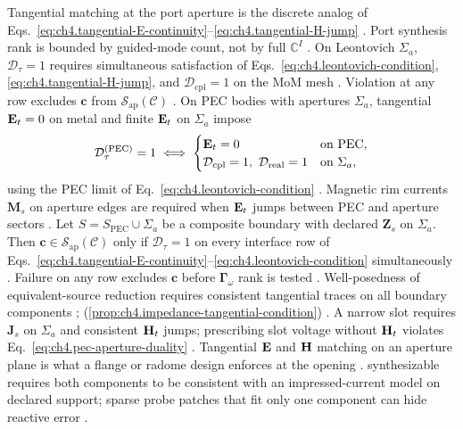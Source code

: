 Tangential matching at the port aperture is the discrete analog of Eqs.~\eqref{eq:ch4.tangential-E-continuity}--\eqref{eq:ch4.tangential-H-jump}
\cite{stratton1941}. Port synthesis rank is bounded by guided-mode count, not by full \(\mathbb{C}^{I}\)
\cite{hansen1988}.
\label{prop:ch4.impedance-tangential-condition}
On Leontovich \(\Sigma_{a}\), \(\mathcal{D}_{\tau}=1\) requires simultaneous satisfaction of
Eqs.~\eqref{eq:ch4.leontovich-condition}, \eqref{eq:ch4.tangential-H-jump}, and
\(\mathcal{D}_{\mathrm{cpl}}=1\) on the MoM mesh \cite{stratton1941}. Violation at any row
excludes \(\mathbf{c}\) from \(\mathcal{S}_{\mathrm{ap}}(\mathcal{C})\) \cite{devaney2004}.
On PEC bodies with apertures \(\Sigma_{a}\), tangential \(\mathbf{E}_{t}=0\) on metal and finite \(\mathbf{E}_{t}\) on \(\Sigma_{a}\) impose
\begin{equation}
\label{eq:ch4.pec-aperture-duality}
\mathcal{D}_{\tau}^{\mathrm{(PEC)}}
=
1
\iff
\begin{cases}
\mathbf{E}_{t}=0 & \text{on PEC},\\
\mathcal{D}_{\mathrm{cpl}}=1,\ \mathcal{D}_{\mathrm{real}}=1 & \text{on }\Sigma_{a},
\end{cases}
\end{equation}
using the PEC limit of Eq.~\eqref{eq:ch4.leontovich-condition} \cite{stratton1941}. Magnetic
rim currents \(\mathbf{M}_{s}\) on aperture edges are required when \(\mathbf{E}_{t}\) jumps between PEC and aperture sectors
\cite{stratton1941}.
\label{thm:ch4.composite-tangential-realizability}
Let \(S=S_{\mathrm{PEC}}\cup\Sigma_{a}\) be a composite boundary with declared \(\mathbf{Z}_{s}\) on \(\Sigma_{a}\). Then
\(\mathbf{c}\in\mathcal{S}_{\mathrm{ap}}(\mathcal{C})\) only if \(\mathcal{D}_{\tau}=1\) on every interface row of
Eqs.~\eqref{eq:ch4.tangential-E-continuity}--\eqref{eq:ch4.leontovich-condition} simultaneously
\cite{stratton1941}. Failure on any row excludes \(\mathbf{c}\) before
\(\boldsymbol{\Gamma}_\omega\) rank is tested \cite{devaney2004}.
Well-posedness of equivalent-source reduction requires consistent tangential traces on all boundary components
\cite{stratton1941}; (\ref{prop:ch4.impedance-tangential-condition}) \cite{harrington2001}.
A narrow slot requires \(\mathbf{J}_{s}\) on \(\Sigma_{a}\) and consistent \(\mathbf{H}_{t}\) jumps; prescribing slot voltage without
\(\mathbf{H}_{t}\) violates Eq.~\eqref{eq:ch4.pec-aperture-duality} \cite{collin2001}.
Tangential $\mathbf{E}$ and $\mathbf{H}$ matching on an aperture plane is what a flange or radome design enforces at the opening \cite{stratton1941}. synthesizable requires both components to be consistent with an impressed-current model on declared support; sparse probe patches that fit only one component can hide reactive error \cite{harrington2001}.
